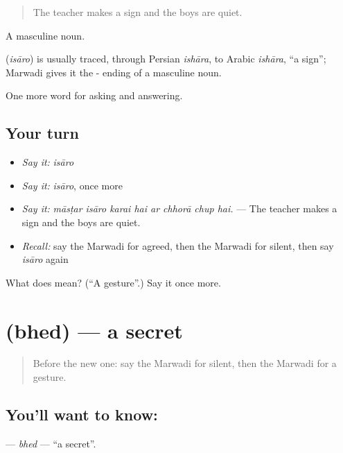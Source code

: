 \begin{quote}
The teacher makes a sign and the boys are quiet.
\end{quote}

A masculine noun.

\begin{cousinweb}
\textbf{} (\emph{isāro}) is usually traced, through Persian \emph{ishāra}, to Arabic \emph{ishāra}, \textquotedblleft{}a sign\textquotedblright{}; Marwadi gives it the - ending of a masculine noun.
\end{cousinweb}

\begin{grammarlens}[title={What you've built}]
One more word for asking and answering.
\end{grammarlens}

\subsection*{Your turn}
\begin{itemize}
\raggedright
  \item \emph{Say it:} \emph{isāro}
  \item \emph{Say it:} \emph{isāro}, once more
  \item \emph{Say it:} \emph{māsṭar isāro karai hai ar chhorā chup hai.} — The teacher makes a sign and the boys are quiet.
  \item \emph{Recall:} say the Marwadi for agreed, then the Marwadi for silent, then say \emph{isāro} again
\end{itemize}

\begin{tcolorbox}[breakable,colback=teal!4,colframe=teal!35!black,title={Before you move on}]
What does  mean? (\textquotedblleft{}A gesture\textquotedblright{}.) Say it once more.
\end{tcolorbox}
\section[\texorpdfstring{\mw{भेद} (bhed)}{भेद (bhed)}]{ (bhed) — a secret}

\label{lesson:MW-C273-bhed}



\begin{quote}
Before the new one: say the Marwadi for silent, then the Marwadi for a gesture.
\end{quote}

\subsection*{You'll want to know: }
\textbf{} — \emph{bhed} — \textquotedblleft{}a secret\textquotedblright{}.

